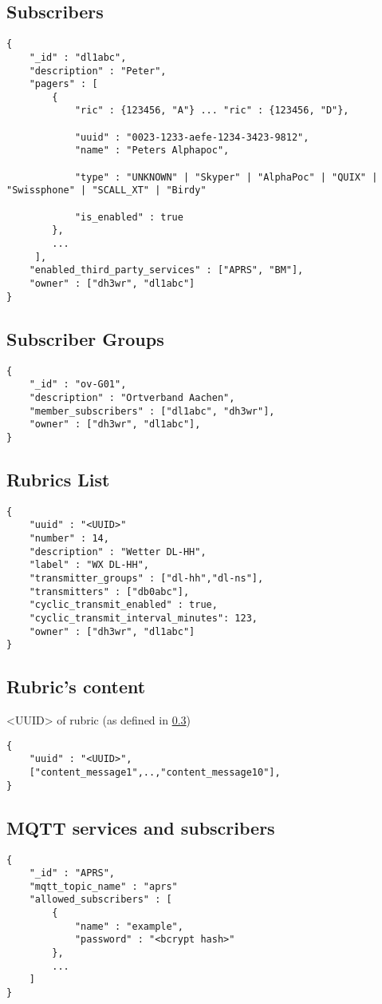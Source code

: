  
\subsection{Subscribers}
\label{protocoldef:couchdb:subscribers}
\begin{lstlisting}
{
	"_id" : "dl1abc",
	"description" : "Peter",
	"pagers" : [
		{
    		"ric" : {123456, "A"} ... "ric" : {123456, "D"},

			"uuid" : "0023-1233-aefe-1234-3423-9812",
    		"name" : "Peters Alphapoc",

			"type" : "UNKNOWN" | "Skyper" | "AlphaPoc" | "QUIX" | "Swissphone" | "SCALL_XT" | "Birdy"

			"is_enabled" : true
     	},
     	...
     ],
    "enabled_third_party_services" : ["APRS", "BM"],
    "owner" : ["dh3wr", "dl1abc"]
}
\end{lstlisting}

\subsection{Subscriber Groups}

\begin{lstlisting}
{
	"_id" : "ov-G01",
	"description" : "Ortverband Aachen",
	"member_subscribers" : ["dl1abc", "dh3wr"],
    "owner" : ["dh3wr", "dl1abc"],
}
\end{lstlisting}

\subsection{Rubrics List}
\label{rubric_list}

\begin{lstlisting}
{
   	"uuid" : "<UUID>"
    "number" : 14,
    "description" : "Wetter DL-HH",
    "label" : "WX DL-HH",
    "transmitter_groups" : ["dl-hh","dl-ns"],
    "transmitters" : ["db0abc"],
	"cyclic_transmit_enabled" : true,
    "cyclic_transmit_interval_minutes": 123,
 	"owner" : ["dh3wr", "dl1abc"]
}
\end{lstlisting}

\subsection{Rubric's content}
<UUID> of rubric (as defined in \ref{rubric_list})

\begin{lstlisting}
{
	"uuid" : "<UUID>",
	["content_message1",..,"content_message10"],
}
\end{lstlisting}

\subsection{MQTT services and subscribers}
\label{protocoldef:couchdb:mqttservicesandsubscribers}
\begin{lstlisting}
{
	"_id" : "APRS",
	"mqtt_topic_name" : "aprs"
	"allowed_subscribers" : [
		{
			"name" : "example",
			"password" : "<bcrypt hash>"
		},
		...
	]
}
\end{lstlisting}


